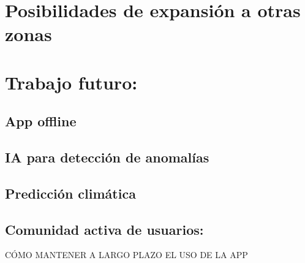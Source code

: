 \section{Posibilidades de expansión a otras zonas}
\section{Trabajo futuro:}

\subsection{App offline}
\subsection{IA para detección de anomalías}
\subsection{Predicción climática}
\subsection{Comunidad activa de usuarios:} 








CÓMO MANTENER A LARGO PLAZO EL USO DE LA APP










